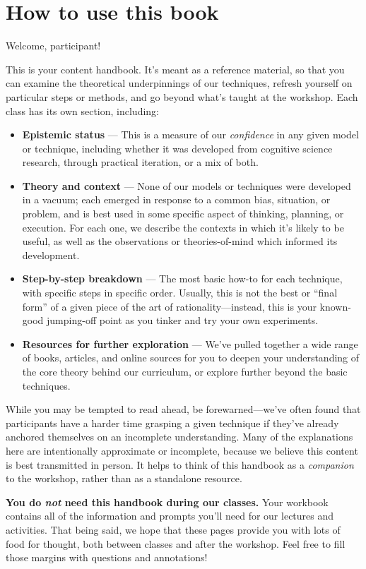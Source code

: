 \clearpage
\chapter*{How to use this book}
Welcome, participant!

This is your content handbook.  It's meant as a reference material, so that you can examine the theoretical underpinnings of our techniques, refresh yourself on particular steps or methods, and go beyond what's taught at the workshop.  Each class has its own section, including:

\begin{itemize}
\item \textbf{Epistemic status} --- This is a measure of our \emph{confidence} in any given model or technique, including whether it was developed from cognitive science research, through practical iteration, or a mix of both.
\item \textbf{Theory and context} --- None of our models or techniques were developed in a vacuum; each emerged in response to a common bias, situation, or problem, and is best used in some specific aspect of thinking, planning, or execution.  For each one, we describe the contexts in which it's likely to be useful, as well as the observations or theories-of-mind which informed its development.
\item \textbf{Step-by-step breakdown} --- The most basic how-to for each technique, with specific steps in specific order.  Usually, this is not the best or ``final form'' of a given piece of the art of rationality---instead, this is your known-good jumping-off point as you tinker and try your own experiments.
\item \textbf{Resources for further exploration} --- We've pulled together a wide range of books, articles, and online sources for you to deepen your understanding of the core theory behind our curriculum, or explore further beyond the basic techniques.
\end{itemize}

While you may be tempted to read ahead, be forewarned---we've often found that participants have a harder time grasping a given technique if they've already anchored themselves on an incomplete understanding.  Many of the explanations here are intentionally approximate or incomplete, because we believe this content is best transmitted in person.  It helps to think of this handbook as a \emph{companion} to the workshop, rather than as a standalone resource.

\textbf{You do \emph{not} need this handbook during our classes.}  Your workbook contains all of the information and prompts you'll need for our lectures and activities.  That being said, we hope that these pages provide you with lots of food for thought, both between classes and after the workshop.  Feel free to fill those margins with questions and annotations!\clearpage



